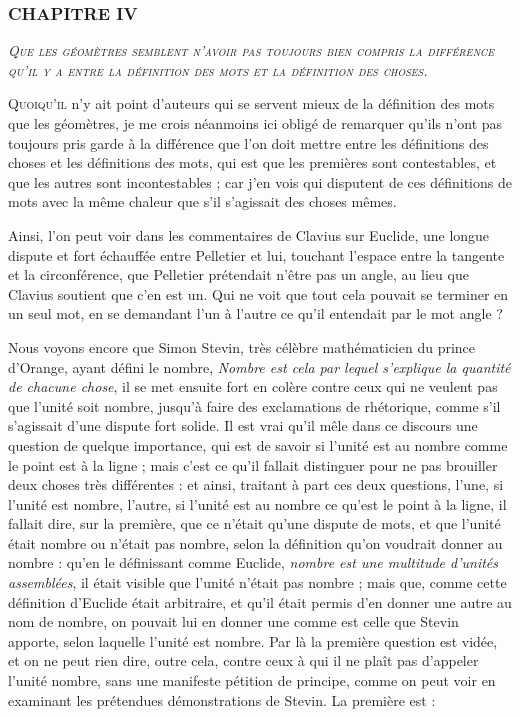 \subsubsection{\centering \Large CHAPITRE IV}
\begin{center}\emph{\large\scshape Que les géomètres semblent n'avoir pas toujours bien compris la différence qu'il y a entre la définition des mots et la définition des choses.}\end{center}

	\lettrine{Q}{uoiqu'il} n'y ait point d'auteurs qui se servent mieux de la définition des mots que les géomètres, je me crois néanmoins ici obligé de remarquer qu'ils n'ont pas toujours pris garde à la différence que l'on doit mettre entre les définitions des choses et les définitions des mots, qui est que les premières sont contestables, et que les autres sont incontestables ; car j'en vois qui disputent de ces définitions de mots avec la même chaleur que s'il s'agissait des choses mêmes.

Ainsi, l'on peut voir dans les commentaires de Clavius sur Euclide, une longue dispute et fort échauffée entre Pelletier et lui, touchant l'espace entre la tangente et la circonférence, que Pelletier prétendait n'être pas un angle, au lieu que Clavius soutient que c'en est un. Qui ne voit que tout cela pouvait se terminer en un seul mot, en se demandant l'un à l'autre ce qu'il entendait par le mot angle ?

Nous voyons encore que Simon Stevin, très célèbre mathématicien du prince d'Orange, ayant défini le nombre, \emph{Nombre est cela par lequel s'explique la quantité de chacune chose}, il se met ensuite fort en colère contre ceux qui ne veulent pas que l'unité soit nombre, jusqu'à faire des exclamations de rhétorique, comme s'il s'agissait d'une dispute fort solide. Il est vrai qu'il mêle dans ce discours une question de quelque importance, qui est de savoir si l'unité est au nombre comme le point est à la ligne ; mais c'est ce qu'il fallait distinguer pour ne pas brouiller deux choses très différentes : et ainsi, traitant à part ces deux questions, l'une, si l'unité est nombre, l'autre, si l'unité est au nombre ce qu'est le point à la ligne, il fallait dire, sur la première, que ce n'était qu'une dispute de mots, et que l'unité était nombre ou n'était pas nombre, selon la définition qu'on voudrait donner au nombre : qu'en le définissant comme Euclide, \emph{nombre est une multitude d'unités assemblées}, il était visible que l'unité n'était pas nombre ; mais que, comme cette définition d'Euclide était arbitraire, et qu'il était permis d'en donner une autre au nom de nombre, on pouvait lui en donner une comme est celle que Stevin apporte, selon laquelle l'unité est nombre. Par là la première question est vidée, et on ne peut rien dire, outre cela, contre ceux à qui il ne plaît pas d'appeler l'unité nombre, sans une manifeste pétition de principe, comme on peut voir en examinant les prétendues démonstrations de Stevin. La première est :


